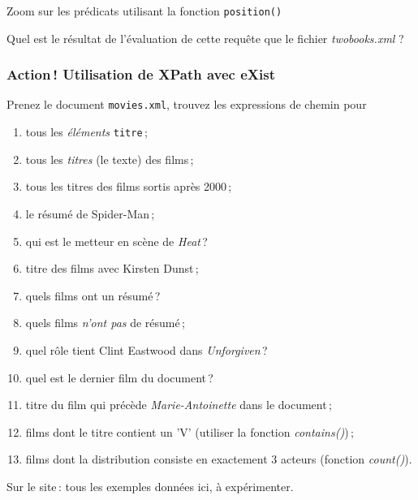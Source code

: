 \begin{frame}{Zoom sur les prédicats utilisant la fonction \texttt{position()} }


{
\begin{exoblock}
Quel est le résultat de l'évaluation de cette requête que le fichier \textit{twobooks.xml} ?
\end{exoblock}
}

\end{frame}

\begin{frame}
\frametitle{Action\,! Utilisation de XPath avec eXist}

Prenez le document \texttt{movies.xml}, trouvez les expressions de chemin pour

\begin{enumerate}
  \item tous les \emph{éléments} \texttt{titre}\,;
  \item tous les \emph{titres} (le texte) des films\,;
  \item tous les titres des films sortis après 2000\,;
  \item le résumé de Spider-Man\,;
  \item qui est le metteur en scène de \textit{Heat}\,?
  \item titre des films avec Kirsten Dunst\,;
  \item quels films ont un résumé\,?
  \item quels films \emph{n'ont pas} de résumé\,;
  \item quel rôle tient Clint Eastwood dans \textit{Unforgiven}\,?
  \item  quel est le dernier film du document\,?
  \item titre du film qui précède \textit{Marie-Antoinette} dans le document\,;
   \item films dont le titre contient un 'V' (utiliser la fonction \textit{contains()})\,;
   \item films dont la distribution consiste en exactement 3 acteurs (fonction \textit{count()}).
  
\end{enumerate}

Sur le site\,: tous les exemples données ici, à expérimenter.
\end{frame}

